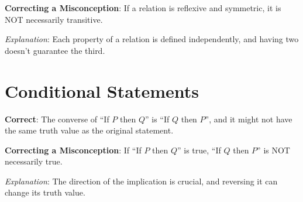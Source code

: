 \documentclass[12pt]{article}
\begin{document}
\textbf{Correcting a Misconception}: If a relation is reflexive and symmetric, it is NOT necessarily transitive.

\textit{Explanation}: Each property of a relation is defined independently, and having two doesn't guarantee the third.

\section*{Conditional Statements}
\textbf{Correct}: The converse of ``If \(P\) then \(Q\)'' is ``If \(Q\) then \(P\)'', and it might not have the same truth value as the original statement.

\textbf{Correcting a Misconception}: If ``If \(P\) then \(Q\)'' is true, ``If \(Q\) then \(P\)'' is NOT necessarily true.

\textit{Explanation}: The direction of the implication is crucial, and reversing it can change its truth value.
\end{document}
